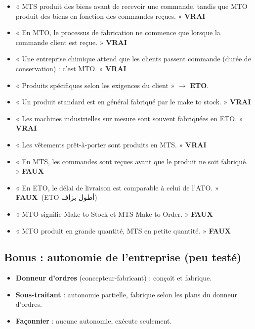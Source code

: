 \documentclass[11pt,a4paper]{article}
\newcommand{\ar}[1]{\textarabic{#1}}
\newcommand{\fr}[1]{\textfrench{#1}}
\newcommand{\vrai}{\textcolor{vert}{\textbf{VRAI}}}
\newcommand{\faux}{\textcolor{rouge}{\textbf{FAUX}}}
\begin{document}
\begin{examen}
\begin{itemize}
\item « MTS produit des biens avant de recevoir une commande, tandis que MTO produit des biens en fonction des commandes reçues. » \vrai
\item « En MTO, le processus de fabrication ne commence que lorsque la commande client est reçue. » \vrai
\item « Une entreprise chimique attend que les clients passent commande (durée de conservation) : c'est MTO. » \vrai
\item « Produits spécifiques selon les exigences du client » $\rightarrow$ \textbf{ETO}.
\item « Un produit standard est en général fabriqué par le make to stock. » \vrai
\item « Les machines industrielles sur mesure sont souvent fabriquées en ETO. » \vrai
\item « Les vêtements prêt-à-porter sont produits en MTS. » \vrai
\end{itemize}
\end{examen}
\begin{piege}
\begin{itemize}
\item « En MTS, les commandes sont reçues avant que le produit ne soit fabriqué. » \faux
\item « En ETO, le délai de livraison est comparable à celui de l'ATO. » \faux \ \ar{(\fr{ETO} أطول بزاف)}
\item « MTO signifie Make to Stock et MTS Make to Order. » \faux
\item « MTO produit en grande quantité, MTS en petite quantité. » \faux
\end{itemize}
\end{piege}

\subsection*{Bonus : autonomie de l'entreprise (peu testé)}
\begin{itemize}
\item \textbf{Donneur d'ordres} (concepteur-fabricant) : conçoit et fabrique.
\item \textbf{Sous-traitant} : autonomie partielle, fabrique selon les plans du donneur d'ordres.
\item \textbf{Façonnier} : aucune autonomie, exécute seulement.
\end{itemize}
\end{document}
